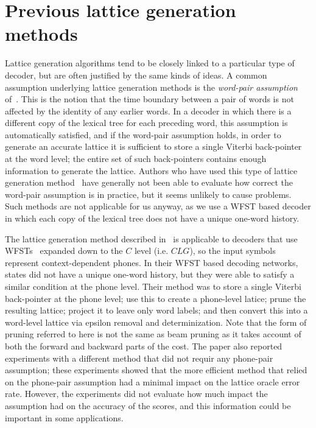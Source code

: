 \documentclass{article}
\begin{document}
\section{Previous lattice generation methods}

Lattice generation algorithms tend to be closely linked to a particular type of decoder,
but are often justified by the same kinds of ideas.
A common assumption underlying lattice generation methods is the {\em word-pair assumption}
of~\cite{ney_word_graph}.  This is the notion that the time boundary between a pair of words
is not affected by the identity of any earlier words.  In a decoder in which there is
a different copy of the lexical tree for each preceding word, this assumption is automatically
satisfied, and if the word-pair assumption holds, in order to generate an accurate lattice it is
sufficient to store a single Viterbi back-pointer at the word level; the entire set of
such back-pointers contains enough information to generate the lattice.  Authors who have used
this type of lattice generation method~\cite{ney_word_graph,odell_thesis} have generally
not been able to evaluate how correct the word-pair assumption is in practice, but it seems
unlikely to cause problems.  Such methods are not applicable for us anyway, as we
use a WFST based decoder in which each copy of the lexical tree does not have a unique
one-word history.

The lattice generation method described in~\cite{efficient_general} 
is applicable to decoders that use WFSTs~\cite{wfst}
expanded down to the $C$ level (i.e. $CLG$), so the input symbols represent
context-dependent phones.  In their WFST based decoding networks, states did
not have a unique one-word history, but they were able to satisfy a similar 
condition at the phone level.  Their method was
to store a single Viterbi back-pointer at the phone level; use this to 
create a phone-level latice; prune the resulting
lattice; project it to leave only word labels; and then convert this into a word-level
lattice via epsilon removal and determinization.
Note that the form of pruning referred to here is not the same as beam pruning as
it takes account of both the forward and backward parts of the cost.
The paper also reported experiments with a different method that did not requir any
phone-pair assumption; these experiments showed that the more
efficient method that relied on the phone-pair assumption 
had a minimal impact on the lattice oracle error rate.  However, the 
experiments did not evaluate how much impact the assumption had on the accuracy of the scores, 
and this information could be important in some applications.
\end{document}
